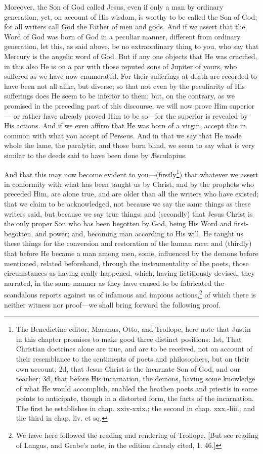 Moreover, the Son of God called Jesus, even if only a man by ordinary generation, yet, on account of His wisdom, is worthy to be called the Son of God; for all writers call God the Father of men and gods. And if we assert that the Word of God was born of God in a peculiar manner, different from ordinary generation, let this, as said above, be no extraordinary thing to you, who say that Mercury is the angelic word of God. But if any one objects that He was crucified, in this also He is on a par with those reputed sons of Jupiter of yours, who suffered as we have now enumerated. For their sufferings at death are recorded to have been not all alike, but diverse; so that not even by the peculiarity of His sufferings does He seem to be inferior to them; but, on the contrary, as we promised in the preceding part of this discourse, we will now prove Him superior— or rather have already proved Him to be so—for the superior is revealed by His actions. And if we even affirm that He was born of a virgin, accept this in common with what you accept of Perseus. And in that we say that He made whole the lame, the paralytic, and those born blind, we seem to say what is very similar to the deeds said to have been done by Æsculapius.


And that this may now become evident to you—(firstly\footnote{The Benedictine editor, Maranus, Otto, and Trollope, here note that Justin in this chapter promises to make good three distinct positions: 1st, That Christian doctrines alone are true, and are to be received, not on account of their resemblance to the sentiments of poets and philosophers, but on their own account; 2d, that Jesus Christ is the incarnate Son of God, and our teacher; 3d, that before His incarnation, the demons, having some knowledge of what He would accomplish, enabled the heathen poets and priestis in some points to anticipate, though in a distorted form, the facts of the incarnation. The first he establishes in chap. xxiv-xxix.; the second in chap. xxx.-liii.; and the third in chap. liv. et sq.}) that whatever we assert in conformity with what has been taught us by Christ, and by the prophets who preceded Him, are alone true, and are older than all the writers who have existed; that we claim to be acknowledged, not because we say the same things as these writers said, but because we say true things: and (secondly) that Jesus Christ is the only proper Son who has been begotten by God, being His Word and first-begotten, and power; and, becoming man according to His will, He  taught us these things for the conversion and restoration of the human race: and (thirdly) that before He became a man among men, some, influenced by the demons before mentioned, related beforehand, through the instrumentality of the poets, those circumstances as having really happened, which, having fictitiously devised, they narrated, in the same manner as they have caused to be fabricated the scandalous reports against us of infamous and impious actions,\footnote{We have here followed the reading and rendering of Trollope. [But see reading of Langus, and Grabe’s note, in the edition already cited, 1. 46.]} of which there is neither witness nor proof—we shall bring forward the following proof.

